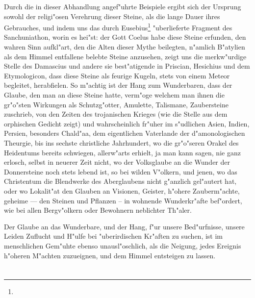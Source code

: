 \documentclass[a4paper, 11pt, oneside, polutonikogreek, german]{article}
\begin{document}
Durch die in dieser Abhandlung angef"uhrte Beispiele ergibt sich der Ursprung sowohl der religi"osen Verehrung dieser Steine, als die lange Dauer ihres Gebrauches, und indem uns das durch Eusebius\footnote{} "uberlieferte Fragment des Sanchuniathon, worin es hei"st: der Gott Coelus habe diese Steine erfunden, den wahren Sinn aufkl"art, den die Alten dieser Mythe beilegten, n"amlich B"atylien als dem Himmel entfallene belebte Steine anzusehen, zeigt uns die merkw"urdige Stelle des Damascius und andere sie best"atigende in Priscian, Hesichius und dem Etymologicon, dass diese Steine als feurige Kugeln, stets von einem Meteor begleitet, herabfielen. So m"achtig ist der Hang zum Wunderbaren, dass der Glaube, den man an diese Steine hatte, verm"oge welchem man ihnen die gr"o"sten Wirkungen als Schutzg"otter, Amulette, Talismane, Zaubersteine zuschrieb, von den Zeiten des trojanischen Krieges (wie die Stelle aus dem orphischen Gedicht zeigt) und wahrscheinlich fr"uher im s"udlichen Asien, Indien, Persien, besonders Chald"aa, dem eigentlichen Vaterlande der d"amonologischen Theurgie, bis ins sechste christliche Jahrhundert, wo die gr"o"seren Orakel des Heidentums bereits schwiegen, allerw"arts erhielt, ja man kann sagen, nie ganz erlosch, selbst in neuerer Zeit nicht, wo der Volksglaube an die Wunder der Donnersteine noch stets lebend ist, so bei wilden V"olkern, und jenen, wo das Christentum die Blendwerke des Aberglaubens nicht g"anzlich gel"autert hat, oder wo Lokalit"at den Glauben an Visionen, Geister, h"ohere Zauberm"achte, geheime --- den Steinen und Pflanzen -- in wohnende Wunderkr"afte bef"ordert, wie bei allen Bergv"olkern oder Bewohnern neblichter Th"aler.

Der Glaube an das Wunderbare, und der Hang, f"ur unsere Bed"urfnisse, unsere Leiden Zuflucht und H"ulfe bei "uberirdischen Kr"aften zu suchen, ist im menschlichen Gem"uhte ebenso unausl"oschlich, als die Neigung, jedes Ereignis h"oheren M"achten zuzueignen, und dem Himmel entsteigen zu lassen.
\clearpage
\section*{\Huge{}}
\end{document}

